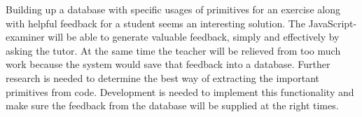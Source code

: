 \documentclass{article}
\begin{document}
Building up a database with specific usages of primitives for an exercise
along with helpful feedback for a student seems an interesting solution. The
JavaScript-examiner will be able to generate valuable feedback, simply and
effectively by asking the tutor. At the same time the teacher will be
relieved from too much work because the system would save that feedback into a
database. Further research is needed to determine the best way of extracting
the important primitives from code. Development is needed to implement this
functionality and make sure the feedback from the database will be supplied at
the right times.



\end{document}
